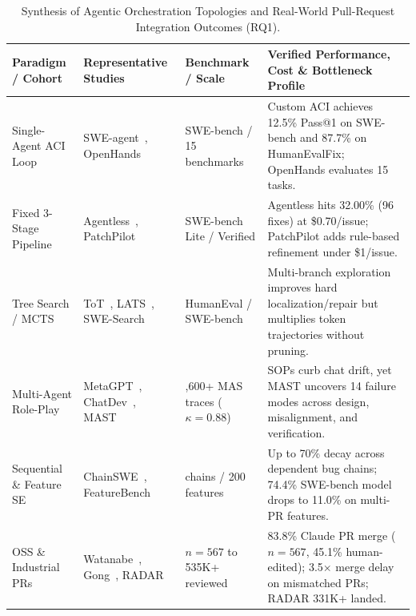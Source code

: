 \documentclass[10pt,twocolumn,a4paper]{article}
\begin{document}
\begin{table}[t!]
\centering
\caption{Synthesis of Agentic Orchestration Topologies and Real-World Pull-Request Integration Outcomes (RQ1).}
\label{tab:rq1_topologies}
\scriptsize
\setlength{\tabcolsep}{3.8pt}
\begin{tabularx}{\textwidth}{>{\raggedright\arraybackslash}p{2.20cm} >{\raggedright\arraybackslash}p{2.85cm} >{\raggedright\arraybackslash}p{2.30cm} X}
\toprule
\textbf{Paradigm / Cohort} & \textbf{Representative Studies} & \textbf{Benchmark / Scale} & \textbf{Verified Performance, Cost \& Bottleneck Profile} \\
\midrule
Single-Agent ACI Loop & SWE-agent~\cite{yang2024sweagent}, OpenHands~\cite{wang2025openhands} & SWE-bench / 15 benchmarks & Custom ACI achieves 12.5\% Pass@1 on SWE-bench and 87.7\% on HumanEvalFix; OpenHands evaluates 15 tasks. \\
Fixed 3-Stage Pipeline & Agentless~\cite{xia2024demystifying}, PatchPilot~\cite{li2025patchpilot} & SWE-bench Lite / Verified & Agentless hits 32.00\% (96 fixes) at \$0.70/issue; PatchPilot adds rule-based refinement under \$1/issue. \\
Tree Search / MCTS & ToT~\cite{yao2023tree}, LATS~\cite{zhou2024language}, SWE-Search~\cite{antoniades2024swesearch} & HumanEval / SWE-bench & Multi-branch exploration improves hard localization/repair but multiplies token trajectories without pruning. \\
Multi-Agent Role-Play & MetaGPT~\cite{hong2024metagpt}, ChatDev~\cite{qian2024chatdev}, MAST~\cite{cemri2025multiagent} & 1,600+ MAS traces ($\kappa=0.88$) & SOPs curb chat drift, yet MAST uncovers 14 failure modes across design, misalignment, and verification. \\
Sequential \& Feature SE & ChainSWE~\cite{jin2026chainswe}, FeatureBench~\cite{zhou2026featurebench} & 304 chains / 200 features & Up to 70\% decay across dependent bug chains; 74.4\% SWE-bench model drops to 11.0\% on multi-PR features. \\
OSS \& Industrial PRs & Watanabe~\cite{watanabe2025use}, Gong~\cite{gong2026analyzing}, RADAR~\cite{adams2026automating} & $n=567$ to 535K+ reviewed & 83.8\% Claude PR merge ($n=567$, 45.1\% human-edited); 3.5$\times$ merge delay on mismatched PRs; RADAR 331K+ landed. \\
\bottomrule
\end{tabularx}
\end{table}
\end{document}

